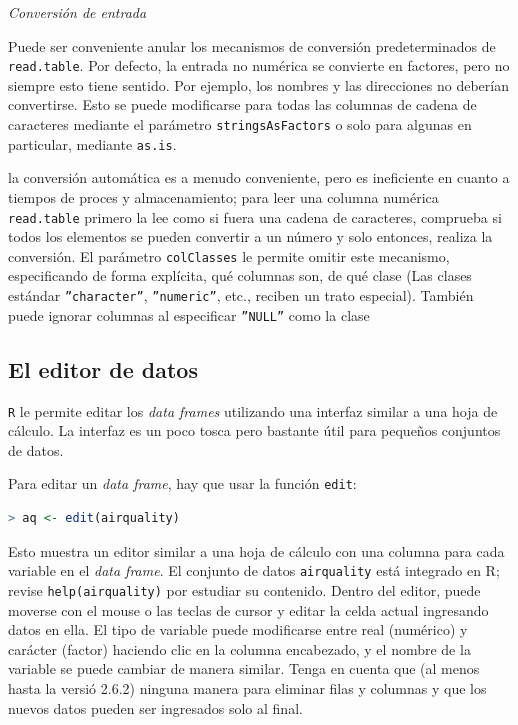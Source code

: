 \textit{Conversión de entrada}

Puede ser conveniente anular los mecanismos de conversión predeterminados de
\texttt{read.table}. Por defecto, la entrada no numérica se convierte en
factores, pero no siempre esto tiene sentido. Por ejemplo, los nombres y las
direcciones no deberían convertirse. Esto se puede modificarse para todas las
columnas de cadena de caracteres mediante el parámetro
\texttt{stringsAsFactors} o solo para algunas en particular, mediante
\texttt{as.is}.

la conversión automática es a menudo conveniente, pero es ineficiente en cuanto
a tiempos de proces y almacenamiento; para leer una columna numérica
\texttt{read.table} primero la lee como si fuera una cadena de caracteres,
comprueba si todos los elementos se pueden convertir a un  número y solo
entonces, realiza la conversión. El parámetro \texttt{colClasses} le permite
omitir este mecanismo, especificando de forma explícita, qué columnas son, de
qué clase (Las clases estándar \texttt{''character''}, \texttt{''numeric''},
etc., reciben un trato especial). También puede ignorar columnas al especificar
\texttt{''NULL''} como la clase

\subsection{El editor de datos}

\texttt{R} le permite editar los \textit{data frames} utilizando una interfaz
similar a una hoja de cálculo. La interfaz es un poco tosca pero bastante útil
para pequeños conjuntos de datos.

Para editar un \textit{data frame}, hay que usar la función \texttt{edit}:

\begin{lstlisting}[language=R]
> aq <- edit(airquality)
\end{lstlisting}


Esto muestra un editor similar a una hoja de cálculo con una columna para cada
variable en el \textit{data frame}. El conjunto de datos \texttt{airquality}
está integrado en R; revise \texttt{help(airquality)} por estudiar su contenido.
Dentro del editor, puede moverse con el mouse o las teclas de cursor y editar la
celda actual ingresando datos en ella. El tipo de variable puede modificarse
entre real (numérico) y carácter (factor) haciendo clic en la columna
encabezado, y el nombre de la variable se puede cambiar de manera similar. Tenga
en cuenta que (al menos hasta la versió 2.6.2)  ninguna manera para eliminar
filas y columnas y que los nuevos datos pueden ser ingresados solo al final.

